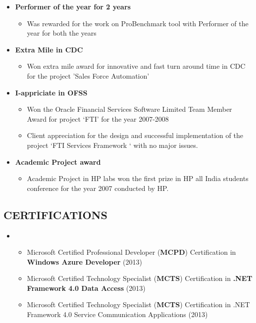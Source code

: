 \documentclass[]{article}
\begin{document}
\begin{itemize}
\itemsep1pt\parskip0pt
\item
  \textbf{Performer of the year for 2 years}

  \begin{itemize}
  \itemsep1pt\parskip0pt
  \item
    Was rewarded for the work on ProBenchmark tool with Performer of the
    year for both the years
  \end{itemize}
\item
  \textbf{Extra Mile in CDC}

  \begin{itemize}
  \itemsep1pt\parskip0pt
  \item
    Won extra mile award for innovative and fast turn around time in CDC
    for the project 'Sales Force Automation'
  \end{itemize}
\item
  \textbf{I-appriciate in OFSS}

  \begin{itemize}
  \itemsep1pt\parskip0pt
  \item
    Won the Oracle Financial Services Software Limited Team Member Award
    for project `FTI' for the year 2007-2008
  \item
    Client appreciation for the design and successful implementation of
    the project `FTI Services Framework ` with no major issues.
  \end{itemize}
\item
  \textbf{Academic Project award}

  \begin{itemize}
  \itemsep1pt\parskip0pt
  \item
    Academic Project in HP labs won the first prize in HP all India
    students conference for the year 2007 conducted by HP.
  \end{itemize}
\end{itemize}

\subsection{CERTIFICATIONS}\label{certifications}

\begin{itemize}
\item
  \begin{itemize}
  \itemsep1pt\parskip0pt
  \item
    Microsoft Certified Professional Developer (\textbf{MCPD})
    Certification in \textbf{Windows Azure Developer} (2013)
  \item
    Microsoft Certified Technology Specialist (\textbf{MCTS})
    Certification in \textbf{.NET Framework 4.0 Data Access} (2013)
  \item
    Microsoft Certified Technology Specialist (\textbf{MCTS})
    Certification in .NET Framework 4.0 Service Communication
    Applications (2013)
  \end{itemize}
\end{itemize}
\end{document}
